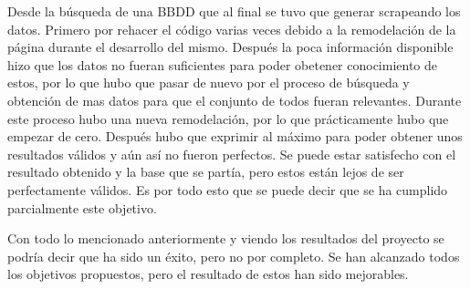 \begin{itemize}
    Desde la búsqueda de una BBDD que al final se tuvo que generar scrapeando los datos. Primero
    por rehacer el código varias veces debido a la remodelación de la página durante el desarrollo
    del mismo. Después la poca información disponible hizo que los datos no fueran suficientes para
    poder obetener conocimiento de estos, por lo que hubo que pasar de nuevo por el proceso de
    búsqueda y obtención de mas datos para que el conjunto de todos fueran relevantes. Durante este
    proceso hubo una nueva remodelación, por lo que prácticamente hubo que empezar de cero. Después
    hubo que exprimir al máximo para poder obtener unos resultados válidos y aún así no fueron perfectos.
    Se puede estar satisfecho con el resultado obtenido y la base que se partía, pero estos están lejos
    de ser perfectamente válidos. Es por todo esto que se puede decir que se ha cumplido parcialmente
    este objetivo.
\end{itemize}

Con todo lo mencionado anteriormente y viendo los resultados del proyecto se podría decir que ha sido
un éxito, pero no por completo. Se han alcanzado todos los objetivos propuestos, pero el resultado
de estos han sido mejorables.
